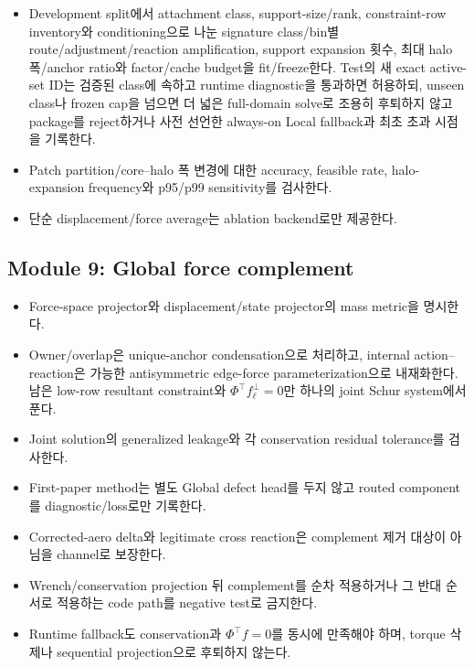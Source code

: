 \documentclass[10pt,a4paper]{article}
\newcommand{\todo}{\textcolor{TodoGray}{\(\square\)}}
\newcommand{\code}[1]{\texttt{#1}}
\begin{document}
\begin{itemize}
  raw-to-routed force adjustment, reaction amplification, generalized-work 보존,
  factor share/rebuild와 scatter/operator-build/factor/dual-solve/backprojection timing을 기록한다.
  Canonical diagnostics source는 \code{eq:support-routing-diagnostics},
  \code{eq:joint-feasibility-residual}, \code{eq:structural-schur-adjustment-diagnostics}다.
  \item[\todo] Development split에서 attachment class, support-size/rank,
  constraint-row inventory와 conditioning으로 나눈 signature class/bin별
  route/adjustment/reaction amplification, support expansion 횟수, 최대 halo 폭/anchor ratio와
  factor/cache budget을 fit/freeze한다. Test의 새 exact active-set ID는 검증된 class에 속하고
  runtime diagnostic을 통과하면 허용하되, unseen class나 frozen cap을 넘으면
  더 넓은 full-domain solve로 조용히 후퇴하지 않고 package를 reject하거나
  사전 선언한 always-on Local fallback과 최초 초과 시점을 기록한다.
  \item[\todo] Patch partition/core--halo 폭 변경에 대한 accuracy, feasible rate,
  halo-expansion frequency와 p95/p99 sensitivity를 검사한다.
  \item[\todo] 단순 displacement/force average는 ablation backend로만 제공한다.
\end{itemize}

\subsection*{Module 9: Global force complement}

\begin{itemize}
  \item[\todo] Force-space projector와 displacement/state projector의 mass metric을 명시한다.
  \item[\todo] Owner/overlap은 unique-anchor condensation으로 처리하고,
  internal action--reaction은 가능한 antisymmetric edge-force parameterization으로 내재화한다.
  남은 low-row resultant constraint와 \(\Phi^\top f_\ell^\perp=0\)만 하나의 joint Schur system에서 푼다.
  \item[\todo] Joint solution의 generalized leakage와 각 conservation residual tolerance를 검사한다.
  \item[\todo] First-paper method는 별도 Global defect head를 두지 않고 routed component를 diagnostic/loss로만 기록한다.
  \item[\todo] Corrected-aero delta와 legitimate cross reaction은 complement 제거 대상이 아님을 channel로 보장한다.
  \item[\todo] Wrench/conservation projection 뒤 complement를 순차 적용하거나 그 반대 순서로 적용하는 code path를 negative test로 금지한다.
  \item[\todo] Runtime fallback도 conservation과 \(\Phi^\top f=0\)를 동시에 만족해야 하며,
  torque 삭제나 sequential projection으로 후퇴하지 않는다.
\end{itemize}
\end{document}
